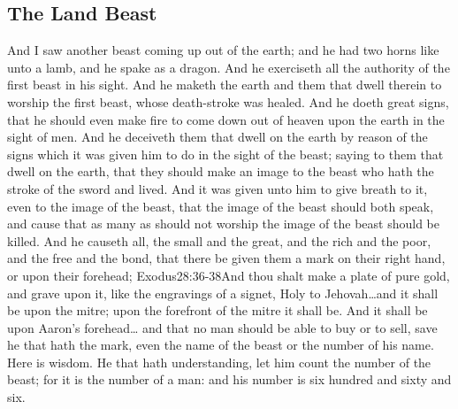 \subsection*{The Land Beast}
 And I saw another beast coming up out of the earth; and he had two horns%
 like unto a lamb, and he spake as a dragon. 
 And he exerciseth all the authority of the first beast in his sight. And he maketh the earth and them that dwell therein to worship the first beast, whose death-stroke was healed. 
 And he doeth great signs, that he should even make fire to come down out of heaven upon the earth in the sight of men.%
 And he deceiveth them that dwell on the earth by reason of the signs which it was given him to do in the sight of the beast; saying to them that dwell on the earth, that they should make an image to the beast who hath the stroke of the sword and lived. 
 And it was given unto him to give breath to it, even to the image of the beast, that the image of the beast should both speak, and cause that as many as should not worship the image of the beast should be killed.%
 And he causeth all, the small and the great, and the rich and the poor, and the free and the bond, that there be given them a mark on their right hand, or upon their forehead;%
				  {Exodus}{28:36-38}{And thou shalt make a plate of pure gold, and grave upon it, like the engravings of a signet, Holy to Jehovah\ldots and it shall be upon the mitre; upon the forefront of the mitre it shall be. And it shall be upon Aaron’s forehead\ldots}
 and that no man should be able to buy or to sell, save he that hath the mark, even the name of the beast or the number of his name. 
 Here is wisdom. He that hath understanding, let him count the number of the beast; for it is the number of a man: and his number is six hundred and sixty and six.